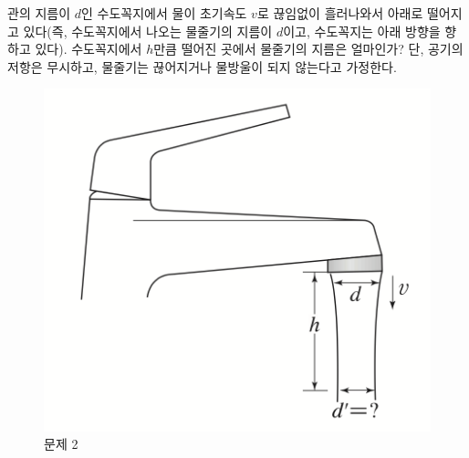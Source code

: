 \documentclass[floatfix,nofootinbib,superscriptaddress,fleqn]{revtex4-2}
\begin{document}
 \vspace{1.cm}

관의 지름이 $d$인 수도꼭지에서 물이 초기속도 $v$로 끊임없이 흘러나와서
아래로 떨어지고 있다(즉, 수도꼭지에서 나오는 물줄기의 지름이 $d$이고,
수도꼭지는 아래 방향을 향하고 있다). 수도꼭지에서 $h$만큼 떨어진 곳에서
물줄기의 지름은 얼마인가? 단, 공기의 저항은 무시하고, 물줄기는
끊어지거나 물방울이 되지 않는다고 가정한다.  
\begin{figure}[ht]
  \centering
\includegraphics[scale=0.6]{Qfig17-1-20220509.png}
  \caption{문제 2}
  \label{fig:2}
\end{figure}
\end{document}
